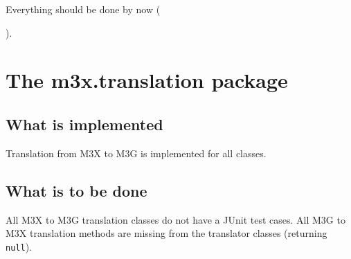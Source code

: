 \documentclass[a4paper,twoside]{article}
\begin{document}
Everything should be done by now (\date{\today}).

\section{The m3x.translation package}

\subsection{What is implemented}

Translation from M3X to M3G is implemented for all classes.

\subsection{What is to be done}

All M3X to M3G translation classes do not have a JUnit test cases.
All M3G to M3X translation methods are missing from the translator classes
(returning \texttt{null}).
\end{document}
